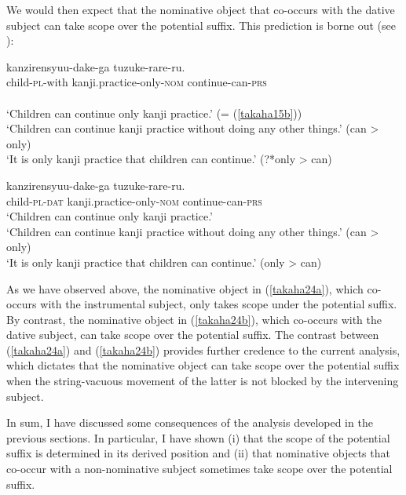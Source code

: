 \documentclass[output=paper]{langscibook}
\begin{document}
We would then expect that the nominative object that co-occurs with the dative subject can take scope over the potential suffix. This prediction is borne out (see \citealt{Ura1999, takahashi2011}):

\begin{exe}
\ex \label{takaha24}
\begin{xlist}
\ex \label{takaha24a}
	 {kanzirensyuu-dake-ga} {tuzuke-rare-ru.}\\
	child-\textsc{pl}-with  kanji.practice-only-\textsc{nom} continue-can-\textsc{prs}\\\\
	\glt ‘Children can continue only kanji practice.’ (= (\ref{takaha15b}))\\ 
	‘Children can continue kanji practice without doing any other things.’ (can \textgreater{} only)\\
	‘It is only kanji practice that children can continue.’ (?*only \textgreater{} can)
    	
\ex \label{takaha24b}
	 {kanzirensyuu-dake-ga} {tuzuke-rare-ru.}\\
	child-\textsc{pl}-\textsc{dat}       kanji.practice-only-\textsc{nom} continue-can-\textsc{prs}\\
	\glt ‘Children can continue only kanji practice.’ \\
	‘Children can continue kanji practice without doing any other things.’ (can \textgreater{} only)\\
	‘It is only kanji practice that children can continue.’ (only \textgreater{} can)
\end{xlist}
\end{exe}

As we have observed above, the nominative object in (\ref{takaha24a}), which co-occurs with the instrumental subject, only takes scope under the potential suffix. By contrast, the nominative object in (\ref{takaha24b}), which co-occurs with the dative subject, can take scope over the potential suffix. The contrast between (\ref{takaha24a}) and (\ref{takaha24b}) provides further credence to the current analysis, which dictates that the nominative object can take scope over the potential suffix when the string-vacuous movement of the latter is not blocked by the intervening subject.

In sum, I have discussed some consequences of the analysis developed in the previous sections. In particular, I have shown (i) that the scope of the potential suffix is determined in its derived position and (ii) that nominative objects that co-occur with a non-nominative subject sometimes take scope over the potential suffix.
\end{document}
